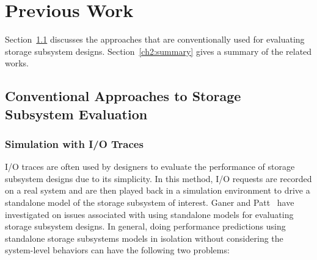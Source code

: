 \chapter{Previous Work}
\label{ch:2}

Section~\ref{sec:ch2-convetional-approaches} discusses the approaches that are conventionally used for evaluating storage subsystem designs. Section~\ref{ch2:summary} gives a summary of the related works.

\section {Conventional Approaches to Storage Subsystem Evaluation}
\label{sec:ch2-convetional-approaches}
\subsection {Simulation with I/O Traces}
\label{sec:ch2-simulation-with-IO-traces}

I/O traces are often used by designers to evaluate the performance of storage subsystem designs due to its simplicity. In this method, I/O requests are recorded on a real system and are then played back in a simulation environment to drive a standalone model of the storage subsystem of interest. Ganer and Patt~\cite{Ganger:1998} have investigated on issues associated with using standalone models for evaluating storage subsystem designs. In general, doing performance predictions using standalone storage subsystems models in isolation without considering the system-level behaviors can have the following two problems:

